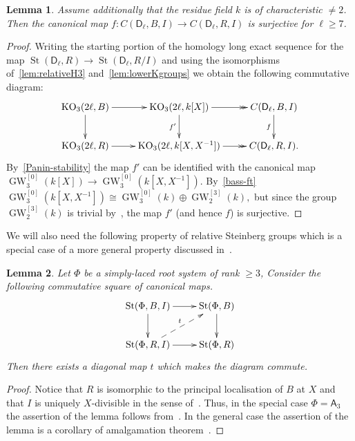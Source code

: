 \documentclass[oneside, 8pt]{amsart}
\newtheorem{lemma}{Lemma}
\theoremstyle{remark}
\theoremstyle{definition}
\numberwithin{lemma}{section}
\numberwithin{prop}{section}
\numberwithin{corollary}{section}
\numberwithin{externaltheorem}{section}
\DeclareMathOperator{\St}{St}
\DeclareMathOperator{\KO}{KO}
\DeclareMathOperator{\GW}{GW}
\newcommand{\rA}{\mathsf{A}}
\newcommand{\rD}{\mathsf{D}}
\numberwithin{equation}{section}
\begin{document}
\begin{lemma} \label{lem:prop41}
Assume additionally that the residue field $k$ is of characteristic $\neq 2$.
Then the canonical map $f\colon C(\rD_\ell, B, I) \to C(\rD_\ell, R, I)$ is surjective for $\ell \geq 7$. \end{lemma}
\begin{proof}
Writing the starting portion of the homology long exact sequence for the map $\St(\rD_\ell, R) \to \St(\rD_\ell, R/I)$ 
and using the isomorphisms of~\cref{lem:relativeH3} and~\cref{lem:lowerKgroups} we obtain the following commutative diagram:
\begin{equation*}\xymatrix{
 \KO_3(2\ell, B) \ar[r] \ar[d] & \KO_3(2\ell, k[X]) \ar[d]_{f'} \ar@{->>}[r] & \ar[d]_{f} C(\rD_\ell, B, I) \\
 \KO_3(2\ell, R) \ar[r]        & \KO_3(2\ell, k[X, X^{-1}]) \ar@{->>}[r]        & C(\rD_\ell, R, I).}\end{equation*}
By~\cref{Panin-stability} the map $f'$ can be identified with the canonical map $\GW_3^{[0]}(k[X]) \to \GW_3^{[0]}(k[X, X^{-1}])$.
By~\cref{bass-ft} $\GW_3^{[0]}(k[X, X^{-1}]) \cong \GW_3^{[0]}(k) \oplus \GW_2^{[3]}(k),$
but since the group $\GW_2^{[3]}(k)$ is trivial by~\cite[Lemma~2.2]{FRS12}, the map $f'$ (and hence $f$) is surjective.
\end{proof} 
 
We will also need the following property of relative Steinberg groups which is a special case of a more general property discussed in~\cite[\S~2]{LS17}.
\begin{lemma}\label{lem:lemma32} Let $\Phi$ be a simply-laced root system of rank $\geq 3$,
Consider the following commutative square of canonical maps.
\[ \xymatrix{
    \St(\Phi, B, I) \ar[r] \ar[d] & \St(\Phi, B) \ar[d] \\
    \St(\Phi, R, I) \ar[r] \ar@{-->}^t[ur] & \St(\Phi, R) } \]
Then there exists a diagonal map $t$ which makes the diagram commute.   
\end{lemma} 
\begin{proof}
 Notice that $R$ is isomorphic to the principal localisation of $B$ at $X$
  and that $I$ is uniquely $X$-divisible in the sense of~\cite[\S~4]{LS17}.
 Thus, in the special case $\Phi = \rA_3$ the assertion of the lemma follows from~\cite[Theorem~3]{LS17}.
 In the general case the assertion of the lemma is a corollary of amalgamation theorem~\cite[Theorem~9]{S15}.
\end{proof}
\end{document}
